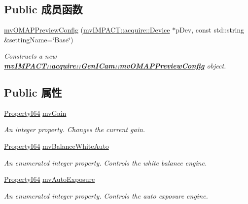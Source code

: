 \subsection*{Public 成员函数}
\begin{DoxyCompactItemize}
\item 
\hyperlink{classmv_i_m_p_a_c_t_1_1acquire_1_1_gen_i_cam_1_1mv_o_m_a_p_preview_config_a7ca4881b513ac1984cba5c221134f1fb}{mv\+O\+M\+A\+P\+Preview\+Config} (\hyperlink{classmv_i_m_p_a_c_t_1_1acquire_1_1_device}{mv\+I\+M\+P\+A\+C\+T\+::acquire\+::\+Device} $\ast$p\+Dev, const std\+::string \&setting\+Name=\char`\"{}Base\char`\"{})
\begin{DoxyCompactList}\small\item\em Constructs a new {\bfseries \hyperlink{classmv_i_m_p_a_c_t_1_1acquire_1_1_gen_i_cam_1_1mv_o_m_a_p_preview_config}{mv\+I\+M\+P\+A\+C\+T\+::acquire\+::\+Gen\+I\+Cam\+::mv\+O\+M\+A\+P\+Preview\+Config}} object. \end{DoxyCompactList}\end{DoxyCompactItemize}
\subsection*{Public 属性}
\begin{DoxyCompactItemize}
\item 
\hyperlink{group___common_interface_ga81749b2696755513663492664a18a893}{Property\+I64} \hyperlink{classmv_i_m_p_a_c_t_1_1acquire_1_1_gen_i_cam_1_1mv_o_m_a_p_preview_config_a6268ed5e73fa21da472e43b50d897b78}{mv\+Gain}
\begin{DoxyCompactList}\small\item\em An integer property. Changes the current gain. \end{DoxyCompactList}\item 
\hyperlink{group___common_interface_ga81749b2696755513663492664a18a893}{Property\+I64} \hyperlink{classmv_i_m_p_a_c_t_1_1acquire_1_1_gen_i_cam_1_1mv_o_m_a_p_preview_config_a3bb2b67fcd204b7ea2d164a3d6fb2013}{mv\+Balance\+White\+Auto}
\begin{DoxyCompactList}\small\item\em An enumerated integer property. Controls the white balance engine. \end{DoxyCompactList}\item 
\hyperlink{group___common_interface_ga81749b2696755513663492664a18a893}{Property\+I64} \hyperlink{classmv_i_m_p_a_c_t_1_1acquire_1_1_gen_i_cam_1_1mv_o_m_a_p_preview_config_a848c745df8f2e95845ed4722f730fdaf}{mv\+Auto\+Exposure}
\begin{DoxyCompactList}\small\item\em An enumerated integer property. Controls the auto exposure engine. \end{DoxyCompactList}\end{DoxyCompactItemize}
